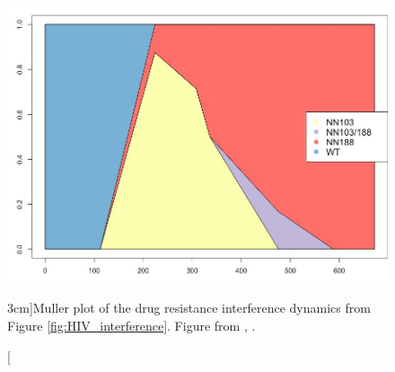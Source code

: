 \begin{figure}
\begin{center}
  \includegraphics[width = \textwidth]{Journal_figs/recom_selection/Pleuni_HIV_interference/DdweQyxU0AA7mXe.jpg}
\end{center}
\caption[][3cm]{Muller plot of the drug resistance interference dynamics from Figure \ref{fig:HIV_interference}. Figure from \citet{Williams548198}, \PLOSccBY.} \label{fig:HIV_interference_M}  
\end{figure}

